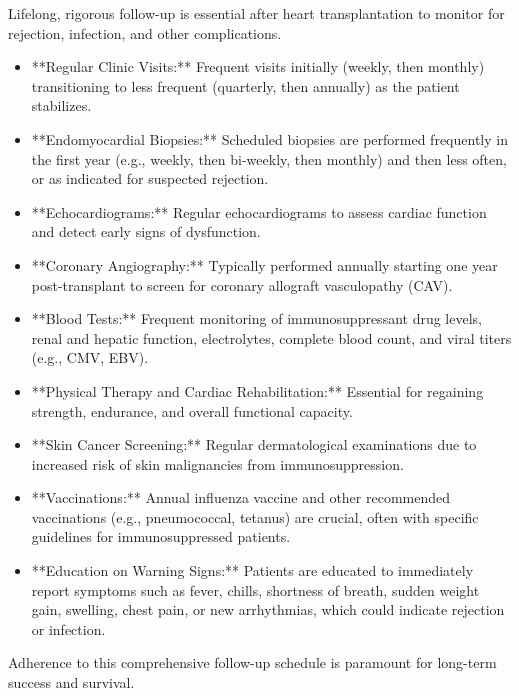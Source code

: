 Lifelong, rigorous follow-up is essential after heart transplantation to monitor for rejection, infection, and other complications.

\begin{itemize}
  \item **Regular Clinic Visits:** Frequent visits initially (weekly, then monthly) transitioning to less frequent (quarterly, then annually) as the patient stabilizes.
  
  \item **Endomyocardial Biopsies:** Scheduled biopsies are performed frequently in the first year (e.g., weekly, then bi-weekly, then monthly) and then less often, or as indicated for suspected rejection.
  
  \item **Echocardiograms:** Regular echocardiograms to assess cardiac function and detect early signs of dysfunction.
  
  \item **Coronary Angiography:** Typically performed annually starting one year post-transplant to screen for coronary allograft vasculopathy (CAV).
  
  \item **Blood Tests:** Frequent monitoring of immunosuppressant drug levels, renal and hepatic function, electrolytes, complete blood count, and viral titers (e.g., CMV, EBV).
  
  \item **Physical Therapy and Cardiac Rehabilitation:** Essential for regaining strength, endurance, and overall functional capacity.
  
  \item **Skin Cancer Screening:** Regular dermatological examinations due to increased risk of skin malignancies from immunosuppression.
  
  \item **Vaccinations:** Annual influenza vaccine and other recommended vaccinations (e.g., pneumococcal, tetanus) are crucial, often with specific guidelines for immunosuppressed patients.
  
  \item **Education on Warning Signs:** Patients are educated to immediately report symptoms such as fever, chills, shortness of breath, sudden weight gain, swelling, chest pain, or new arrhythmias, which could indicate rejection or infection.
\end{itemize}

Adherence to this comprehensive follow-up schedule is paramount for long-term success and survival.

